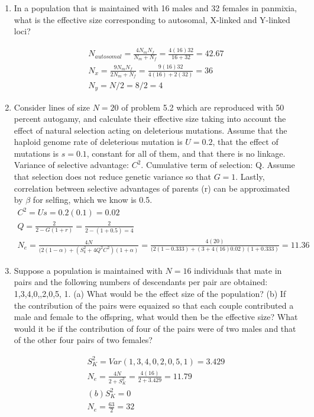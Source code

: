 \documentclass[12pt]{amsart}
\begin{document}
\begin{enumerate}
\item In a population that is maintained with 16 males and 32 females in panmixia, what is the effective size corresponding to autosomal, X-linked and Y-linked loci?

\begin{gather*}
N_{autosomal} = \frac{4N_mN_f}{N_m + N_f} = \frac{4(16)32}{16 + 32} =  42.67\\
N_x = \frac{9N_mN_f}{2N_m + N_f} = \frac{9(16)32}{4(16) + 2(32)} = 36\\
N_y = N/2 = 8/2 = 4
\end{gather*}

\item Consider lines of size $N = 20$ of problem 5.2 which are reproduced with 50 percent autogamy, and calculate their effective size taking into account the effect of natural selection acting on deleterious mutations. Assume that the haploid genome rate of deleterious mutation is $U = 0.2$, that the effect of mutations is $s = 0.1$, constant for all of them, and that there is no linkage.\\
Variance of selective advantage: $C^2$. Cumulative term of selection: Q. Assume that selection does not reduce genetic variance so that $G = 1$. Lastly, correlation between selective advantages of parents (r) can be approximated by $\beta$ for selfing, which we know is 0.5.
\begin{gather*}
C^2 = Us = 0.2(0.1) = 0.02\\
Q = \frac{2}{2 - G(1+r)} = \frac{2}{2 - (1+0.5) = 4}\\
N_e = \frac{4N}{(2(1-\alpha) + (S_k^2 + 4Q^2C^2)(1+\alpha)} = \frac{4(20)}{(2(1-0.333) + (3 + 4(16)0.02)(1+0.333)} = 11.36 
\end{gather*}

\item Suppose a population is maintained with $N=16$ individuals that mate in pairs and the following numbers of descendants per pair are obtained: 1,3,4,0,,2,0,5, 1. (a) What would be the effect size of the population? (b) If the contribution of the pairs were equaized so that each couple contributed a male and female to the offspring, what would then be the effective size? What would it be if the contribution of four of the pairs were of two males and that of the other four pairs of two females?

\begin{gather*}
S_K^2 = Var(1,3,4,0,2,0,5,1) = 3.429\\
N_e = \frac{4N}{2 + S_K^2} = \frac{4(16)}{2 + 3.429} = 11.79\\
(b) S_K^2 = 0\\
N_e = \frac{63}{2} = 32
\end{gather*}

\end{enumerate}
\end{document}

